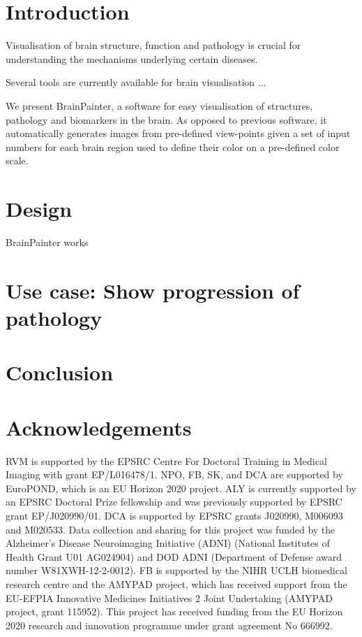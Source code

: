 \documentclass[final,5p,times,twocolumn,authoryear]{elsarticle}
\begin{document}

\FloatBarrier
\section{Introduction}
\label{intro}


Visualisation of brain structure, function and pathology is crucial for understanding the mechanisms underlying certain diseases.

Several tools are currently available for brain visualisation ...

We present BrainPainter, a software for easy visualisation of structures, pathology and biomarkers in the brain. As opposed to previous software, it automatically generates images from pre-defined view-points given a set of input numbers for each brain region used to define their color on a pre-defined color scale.  


\section{Design}
\label{design}



BrainPainter works 



\FloatBarrier
\section{Use case: Show progression of pathology}
\label{design}


\section{Conclusion} 




\FloatBarrier
\section{Acknowledgements}




RVM is supported by the EPSRC Centre For Doctoral Training in Medical Imaging with grant EP/L016478/1. NPO, FB, SK, and DCA are supported by EuroPOND, which is an EU Horizon 2020 project. ALY is currently supported by an EPSRC Doctoral Prize fellowship and was previously supported by EPSRC grant EP/J020990/01. DCA is supported by EPSRC grants J020990, M006093 and M020533. Data collection and sharing for this project was funded by the Alzheimer's Disease Neuroimaging Initiative (ADNI) (National Institutes of Health Grant U01 AG024904) and DOD ADNI (Department of Defense award number W81XWH-12-2-0012). FB is supported by the NIHR UCLH biomedical research centre and the AMYPAD project, which has received support from the EU-EFPIA Innovative Medicines Initiatives 2 Joint Undertaking (AMYPAD project, grant 115952). This project has received funding from the EU Horizon 2020 research and innovation programme under grant agreement No 666992.
\end{document}
